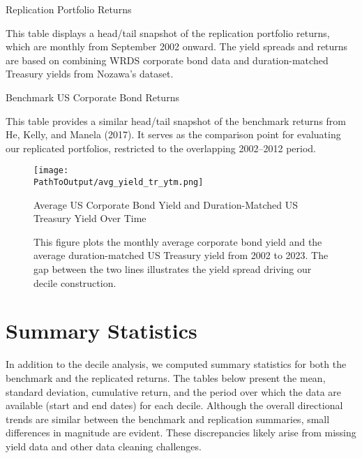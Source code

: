 \documentclass[12pt]{article}
\begin{document}
\begin{table}[htbp]
\centering
\caption{Replication Portfolio Returns}
{\footnotesize
\renewcommand{\arraystretch}{0.9} %
\resizebox{\textwidth}{!}{%
  
}
}
\caption*{\footnotesize This table displays a head/tail snapshot of the replication portfolio returns, which are monthly from September 2002 onward. The yield spreads and returns are based on combining WRDS corporate bond data and duration-matched Treasury yields from Nozawa’s dataset.}
\label{table:replication_sample}
\end{table}

\begin{table}[htbp]
\centering
\caption{Benchmark US Corporate Bond Returns}
{\footnotesize
\renewcommand{\arraystretch}{0.9}
\resizebox{\textwidth}{!}{%
  
}
}
\caption*{\footnotesize This table provides a similar head/tail snapshot of the benchmark returns from He, Kelly, and Manela (2017). It serves as the comparison point for evaluating our replicated portfolios, restricted to the overlapping 2002--2012 period.}
\label{table:benchmark}
\end{table}

\begin{figure}[H]
\centering
\texttt{[image: \\PathToOutput/avg\_yield\_tr\_ytm.png]}
\caption{Average US Corporate Bond Yield and Duration-Matched US Treasury Yield Over Time}
\caption*{\footnotesize This figure plots the monthly average corporate bond yield and the average duration-matched US Treasury yield from 2002 to 2023. The gap between the two lines illustrates the yield spread driving our decile construction.}
\label{fig:avg_yield_tr_ytm}
\end{figure}

\section{Summary Statistics}
In addition to the decile analysis, we computed summary statistics for both the benchmark and the replicated returns. The tables below present the mean, standard deviation, cumulative return, and the period over which the data are available (start and end dates) for each decile. Although the overall directional trends are similar between the benchmark and replication summaries, small differences in magnitude are evident. These discrepancies likely arise from missing yield data and other data cleaning challenges.
\end{document}
